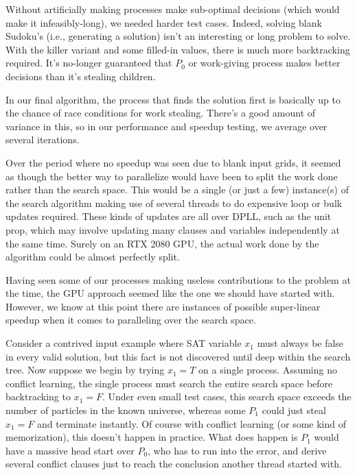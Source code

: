 \documentclass{article}
\begin{document}
Without artificially making processes make sub-optimal decisions (which would make it infeasibly-long), we needed harder test cases. Indeed, solving blank Sudoku's (i.e., generating a solution) isn't an interesting or long problem to solve. With the killer variant and some filled-in values, there is much more backtracking required. It's no-longer guaranteed that $P_0$ or work-giving process makes better decisions than it's stealing children. 

In our final algorithm, the process that finds the solution first is basically up to the chance of race conditions for work stealing. There's a good amount of variance in this, so in our performance and speedup testing, we average over several iterations.

Over the period where no speedup was seen due to blank input grids, it seemed as though the better way to parallelize would have been to split the work done rather than the search space. This would be a single (or just a few) instance(s) of the search algorithm making use of several threads to do expensive loop or bulk updates required. These kinds of updates are all over DPLL, such as the unit prop, which may involve updating many clauses and variables independently at the same time. Surely on an RTX 2080 GPU, the actual work done by the algorithm could be almost perfectly split. 

Having seen some of our processes making useless contributions to the problem at the time, the GPU approach seemed like the one we should have started with. However, we know at this point there are instances of possible super-linear speedup when it comes to paralleling over the search space. 

Consider a contrived input example where SAT variable $x_1$ must always be false in every valid solution, but this fact is not discovered until deep within the search tree. Now suppose we begin by trying $x_1 = T$ on a single process. Assuming no conflict learning, the single process must search the entire search space before backtracking to $x_1 = F$. Under even small test cases, this search space exceeds the number of particles in the known universe, whereas some $P_1$ could just steal $x_1 = F$ and terminate instantly. Of course with conflict learning (or some kind of memorization), this doesn't happen in practice. What does happen is $P_1$ would have a massive head start over $P_0$, who has to run into the error, and derive several conflict clauses just to reach the conclusion another thread started with.
\end{document}
